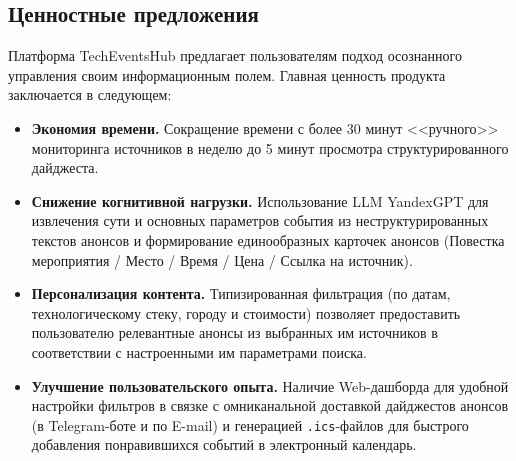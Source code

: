 \subsection*{Ценностные предложения}
Платформа TechEventsHub предлагает пользователям подход осознанного управления своим информационным полем. 
Главная ценность продукта заключается в следующем:
\begin{itemize}
\item \textbf{Экономия времени.} Сокращение времени с более 30 минут <<ручного>> мониторинга источников в неделю до 5 минут просмотра структурированного дайджеста.
\item \textbf{Снижение когнитивной нагрузки.} Использование LLM YandexGPT для извлечения сути и основных параметров события из неструктурированных текстов анонсов и формирование единообразных карточек анонсов (Повестка мероприятия / Место / Время / Цена / Ссылка на источник).
\item \textbf{Персонализация контента.} Типизированная фильтрация (по датам, технологическому стеку, городу и стоимости) позволяет предоставить пользователю релевантные анонсы из выбранных им источников в соответствии с настроенными им параметрами поиска.
\item \textbf{Улучшение пользовательского опыта.} Наличие Web-дашборда для удобной настройки фильтров в связке с омниканальной доставкой дайджестов анонсов (в Telegram-боте и по E-mail) и генерацией \texttt{.ics}-файлов для быстрого добавления понравившихся событий в электронный календарь.
\end{itemize}

